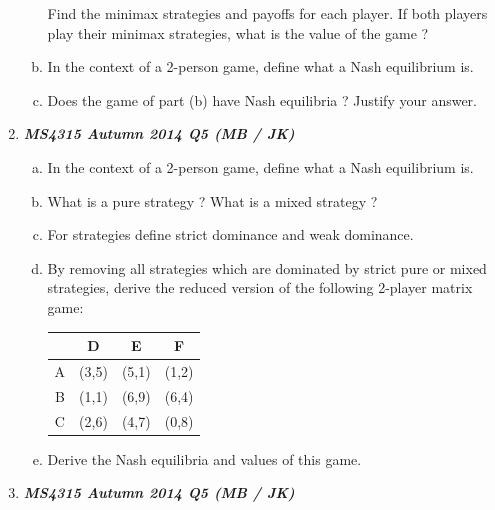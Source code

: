 \documentclass[]{report}
\begin{document}
\begin{enumerate}
\begin{enumerate}[(a)]
\begin{center}
\begin{tabular}{|c|c|c|}
		\end{tabular}
	\end{center}
	Find the minimax strategies and payoffs for each player. If both players
	play their minimax strategies, what is the value of the game ? 
	\item In the context of a 2-person game, define what a Nash equilibrium is. 
	\item Does the game of part (b) have Nash equilibria ? Justify your answer.
\end{enumerate}	
\item \textbf{\textit{MS4315 Autumn 2014 Q5  (MB / JK)}}
\begin{enumerate}[(a)]
	\item In the context of a 2-person game, define what a Nash equilibrium is. 
	\item What is a pure strategy ? What is a mixed strategy ? 
	\item For strategies define strict dominance and weak dominance. 
	\item By removing all strategies which are dominated by strict pure or mixed
	strategies, derive the reduced version of the following 2-player matrix
	game:
	\begin{center}
		\begin{tabular}{|c|c|c|c|} \hline 
			& D & E & F \\ \hline
			A & (3,5) & (5,1) &  (1,2) \\ \hline
			B & (1,1) & (6,9) & (6,4) \\ \hline
			C & (2,6) & (4,7) & (0,8) \\ \hline
		\end{tabular}
	\end{center}
	\item  Derive the Nash equilibria and values of this game. 
\end{enumerate}
\item \textbf{\textit{MS4315 Autumn 2014 Q5  (MB / JK)}}


\end{enumerate}
\end{document}
